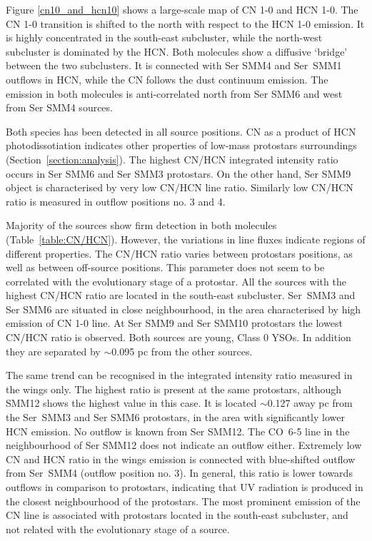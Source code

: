 \documentclass{aa}
\begin{document}
Figure \ref{cn10_and_hcn10} shows a large-scale map of CN 1-0 and HCN 1-0. The CN 1-0 transition is shifted to the north with respect to the HCN 1-0 emission. It is
highly concentrated in the south-east subcluster, while the north-west subcluster is dominated by the HCN. Both
molecules show a diffusive ‘bridge’ between the two subclusters. It is connected with Ser SMM4 and
Ser~SMM1 outflows in HCN, while the CN follows the dust continuum emission. The emission in both
molecules is anti-correlated north from Ser SMM6 and west from Ser SMM4 sources. 

Both species has been detected in all source positions. CN as a product of HCN photodissotiation
indicates other properties of low-mass protostars surroundings (Section~\ref{section:analysis}). The highest CN/HCN
integrated intensity ratio occurs in Ser SMM6 and Ser SMM3 protostars. On the other hand, Ser SMM9 object is characterised by very low CN/HCN line ratio.
Similarly low CN/HCN ratio is measured in outflow positions no. 3 and 4.

Majority of the sources show firm detection in both molecules (Table~\ref{table:CN/HCN}). However,
the variations in line fluxes indicate regions of different properties. The CN/HCN ratio varies
between protostars positions, as well as between off-source positions. This parameter does not seem to be correlated with the
evolutionary stage of a protostar. All the sources with the highest CN/HCN ratio are located in the south-east subcluster. Ser~SMM3 and Ser SMM6 are situated in close neighbourhood, in the area characterised
by high emission of CN 1-0 line. At Ser SMM9 and Ser SMM10 protostars the lowest CN/HCN ratio is
observed. Both sources are young, Class 0 YSOs. In addition they are separated by $\sim$0.095 pc from the other sources.

The same trend can be recognised in the integrated intensity ratio measured in the wings only. The highest ratio is present at the same protostars, although SMM12 shows the highest value in this case. It is located $\sim$0.127 away pc from the Ser~SMM3 and Ser SMM6 protostars, in the area with significantly lower HCN emission. No outflow is known from Ser SMM12. The \mbox{CO 6-5} line in the neighbourhood of Ser SMM12 does not indicate an outflow either. Extremely low CN and HCN ratio in the wings emission is connected with blue-shifted outflow from Ser~SMM4 (outflow position no. 3). In general, this ratio is lower towards outflows in comparison to protostars, indicating that UV radiation is produced in the closest neighbourhood of the protostars. The most prominent emission of the CN line is associated with protostars located in the south-east subcluster, and not related with the evolutionary stage of a source.
\end{document}
